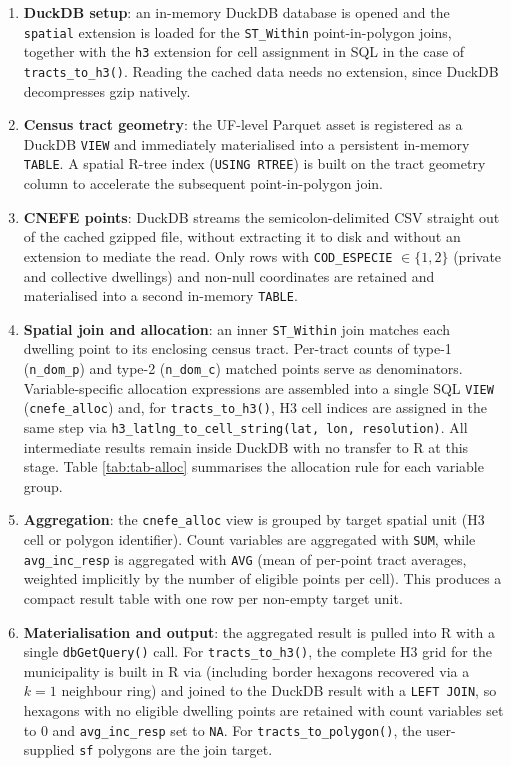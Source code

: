 \begin{enumerate}
\def\labelenumi{\arabic{enumi}.}
\item
  \textbf{DuckDB setup}: an in-memory DuckDB database is opened and the
  \texttt{spatial} extension is loaded for the \texttt{ST\_Within} point-in-polygon
  joins, together with the \texttt{h3} extension for cell assignment in SQL
  in the case of \texttt{tracts\_to\_h3()}. Reading the
  cached data needs no extension, since DuckDB decompresses gzip
  natively.
\item
  \textbf{Census tract geometry}: the UF-level Parquet asset is registered
  as a DuckDB \texttt{VIEW} and immediately materialised into a persistent
  in-memory \texttt{TABLE}. A spatial R-tree index (\texttt{USING\ RTREE}) is built
  on the tract geometry column to accelerate the subsequent
  point-in-polygon join.
\item
  \textbf{CNEFE points}: DuckDB streams the semicolon-delimited CSV
  straight out of the cached gzipped file, without extracting it to
  disk and without an extension to mediate the read. Only
  rows with \texttt{COD\_ESPECIE} \(\in \{1, 2\}\) (private and collective
  dwellings) and non-null coordinates are retained and materialised
  into a second in-memory \texttt{TABLE}.
\item
  \textbf{Spatial join and allocation}: an inner \texttt{ST\_Within} join matches
  each dwelling point to its enclosing census tract. Per-tract counts
  of type-1 (\texttt{n\_dom\_p}) and type-2 (\texttt{n\_dom\_c}) matched points serve as
  denominators. Variable-specific allocation expressions are assembled
  into a single SQL \texttt{VIEW} (\texttt{cnefe\_alloc}) and, for \texttt{tracts\_to\_h3()},
  H3 cell indices are assigned in the same step via
  \texttt{h3\_latlng\_to\_cell\_string(lat,\ lon,\ resolution)}. All intermediate
  results remain inside DuckDB with no transfer to R at this stage.
  Table \ref{tab:tab-alloc} summarises the allocation rule for each
  variable group.
\item
  \textbf{Aggregation}: the \texttt{cnefe\_alloc} view is grouped by target spatial
  unit (H3 cell or polygon identifier). Count variables are aggregated
  with \texttt{SUM}, while \texttt{avg\_inc\_resp} is aggregated with \texttt{AVG} (mean of
  per-point tract averages, weighted implicitly by the number of
  eligible points per cell). This produces a compact result table with
  one row per non-empty target unit.
\item
  \textbf{Materialisation and output}: the aggregated result is pulled into
  R with a single \texttt{dbGetQuery()} call. For \texttt{tracts\_to\_h3()}, the
  complete H3 grid for the municipality is built in R via
   (including border hexagons recovered via a \(k = 1\)
  neighbour ring) and joined to the DuckDB result with a \texttt{LEFT\ JOIN},
  so hexagons with no eligible dwelling points are retained with count
  variables set to 0 and \texttt{avg\_inc\_resp} set to \texttt{NA}. For
  \texttt{tracts\_to\_polygon()}, the user-supplied \texttt{sf} polygons are the join
  target.
\end{enumerate}

